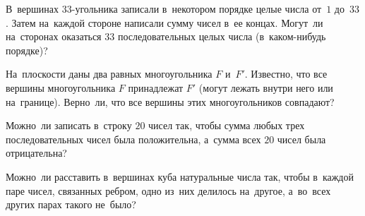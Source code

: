 \begin{problems}
\item
В~вершинах $33$-угольника записали в~некотором порядке целые числа от~$1$ до~$33$.
Затем на~каждой стороне написали сумму чисел в~ее концах.
Могут~ли на~сторонах оказаться $33$ последовательных целых числа (в~каком-нибудь
порядке)?

\item
На~плоскости даны два равных многоугольника $F$ и~$F'$.
Известно, что все вершины многоугольника $F$ принадлежат $F'$
(могут лежать внутри него или на~границе).
Верно~ли, что все вершины этих многоугольников совпадают?

\item
Можно~ли записать в~строку $20$ чисел так, чтобы сумма любых трех
последовательных чисел была положительна, а~сумма всех $20$ чисел была
отрицательна?

\item
Можно~ли расставить в~вершинах куба натуральные числа так, чтобы в~каждой паре
чисел, связанных ребром, одно из~них делилось на~другое, а~во~всех других парах
такого не~было?

\end{problems}

